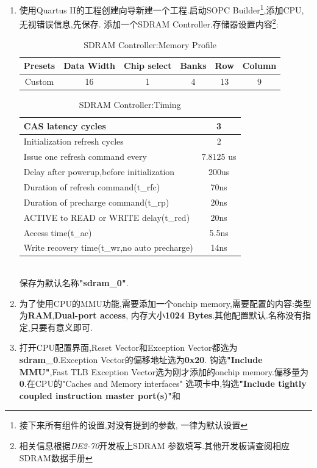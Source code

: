 \documentclass[12pt,a4paper,titlepage]{article}
\begin{document}
\begin{enumerate}
\item 使用Quartus II的工程创建向导新建一个工程.启动SOPC Builder\footnote{{接下来所有组件的设置,对没有提到的参数,
一律为默认设置}},添加CPU,{无视错误信息},先保存.
添加一个SDRAM Controller.存储器设置内容\footnote{相关信息根据\textit{DE2-70}开发板上SDRAM
参数填写.其他开发板请查阅相应SDRAM数据手册}:
\begin{table}[!bhtp]
\centering
\begin{tabular}{|c|c|c|c|c|c|}
\hline
Presets & Data Width & Chip select & Banks & Row & Column \\
\hline
Custom & 16 & 1 & 4 & 13 & 9\\
\hline
\end{tabular}
\caption{SDRAM Controller:Memory Profile}
\end{table}
\begin{table}[!bhtp]
\centering
\begin{tabular}{|l|c|}\hline
CAS latency cycles & 3\\\hline
Initialization refresh cycles & 2\\\hline
Issue one refresh command every & 7.8125 us\\\hline
Delay after powerup,before initialization & 200us\\\hline
Duration of refresh command(t\_rfc) & 70ns\\\hline
Duration of precharge command(t\_rp) & 20ns\\\hline
ACTIVE to READ or WRITE delay(t\_rcd) & 20ns\\\hline
Access time(t\_ac) & 5.5ns\\\hline
Write recovery time(t\_wr,no auto precharge) & 14ns\\\hline
\end{tabular}
\caption{SDRAM Controller:Timing}
\end{table}
\\保存为默认名称\textbf{"sdram\_0"}.
\item 为了使用CPU的MMU功能,需要添加一个onchip memory,需要配置的内容:类型为\textbf{RAM},\textbf{Dual-port access},
内存大小\textbf{1024 Bytes}.其他配置默认.名称没有指定,只要有意义即可.
\item 打开CPU配置界面,Reset Vector和Exception Vector都选为\textbf{sdram\_0}.Exception Vector的偏移地址选为\textbf{0x20}.
钩选\textbf{"Include MMU"},Fast TLB Exception Vector选为刚才添加的onchip memory.偏移量为\textbf{0}.在CPU的"Caches and Memory interfaces"
选项卡中,钩选\textbf{"Include tightly coupled instruction master port(s)"}和

\end{enumerate}
\end{document}
